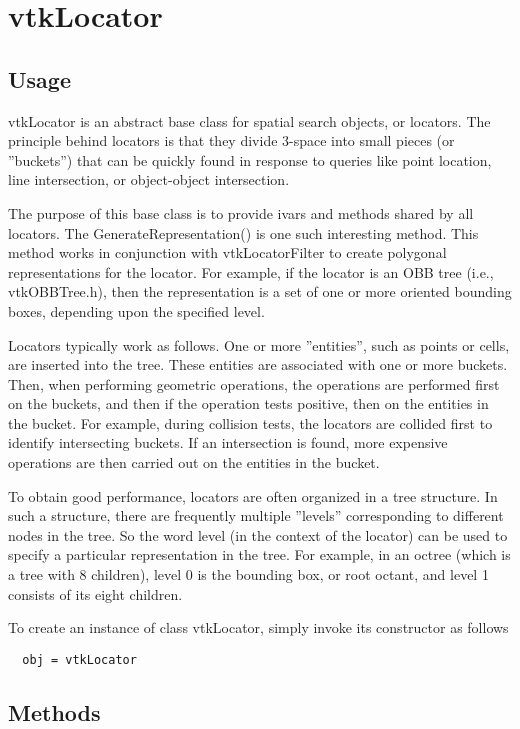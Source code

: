 \section{vtkLocator}

\subsection{Usage}

 vtkLocator is an abstract base class for spatial search objects, or 
 locators. The principle behind locators is that they divide 3-space into 
 small pieces (or ''buckets'') that can be quickly found in response to 
 queries like point location, line intersection, or object-object 
 intersection.

 The purpose of this base class is to provide ivars and methods shared by 
 all locators. The GenerateRepresentation() is one such interesting method.
 This method works in conjunction with vtkLocatorFilter to create polygonal
 representations for the locator. For example, if the locator is an OBB tree
 (i.e., vtkOBBTree.h), then the representation is a set of one or more 
 oriented bounding boxes, depending upon the specified level.
 
 Locators typically work as follows. One or more ''entities'', such as 
 points or cells, are inserted into the tree. These entities are associated
 with one or more buckets. Then, when performing geometric operations, the
 operations are performed first on the buckets, and then if the operation
 tests positive, then on the entities in the bucket. For example, during
 collision tests, the locators are collided first to identify intersecting
 buckets. If an intersection is found, more expensive operations are then
 carried out on the entities in the bucket.
 
 To obtain good performance, locators are often organized in a tree
 structure.  In such a structure, there are frequently multiple ''levels''
 corresponding to different nodes in the tree. So the word level (in the
 context of the locator) can be used to specify a particular representation
 in the tree.  For example, in an octree (which is a tree with 8 children),
 level 0 is the bounding box, or root octant, and level 1 consists of its
 eight children.

To create an instance of class vtkLocator, simply
invoke its constructor as follows
\begin{verbatim}
  obj = vtkLocator
\end{verbatim}
\subsection{Methods}

